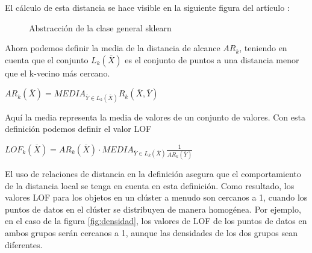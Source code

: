 El cálculo de esta distancia se hace visible en la siguiente figura 
del artículo  \cite{breunigLOFIdentifyingDensitybased2000}: 

\begin{figure}[h]
    \caption{\label{fig:base-abstraccion} Abstracción de la clase general sklearn}
\end{figure}

Ahora podemos definir la media de la distancia de alcance $AR_k$, teniendo
en cuenta que el conjunto $L_k(\overline{X})$ es el conjunto de puntos a una
distancia menor que el k-vecino más cercano. 

\begin{center}
    $AR_k(\overline{X}) = MEDIA_{\overline{Y} \in L_k(\overline{X}) } R_k(\overline{X},\overline{Y})$
\end{center}

Aquí la media representa la media de valores de un conjunto de valores.
Con esta definición podemos definir el valor LOF


\begin{center}
    $LOF_k(\overline{X}) = AR_k(\overline{X}) \cdot MEDIA_{\overline{Y} \in L_k(\overline{X}) }       \frac{1}{AR_k(\overline{Y})} $
\end{center}

El uso de relaciones de distancia en la definición asegura que el
comportamiento de la distancia local se tenga en cuenta en esta definición.
Como resultado, los valores LOF para los objetos en un clúster
a menudo son cercanos a 1, cuando los puntos de datos en el clúster
se distribuyen de manera homogénea. Por ejemplo, en el caso de la 
figura \ref{fig:densidad}, los valores de LOF de los puntos de datos
en ambos grupos serán cercanos a 1, aunque las densidades de los dos 
grupos sean diferentes.

